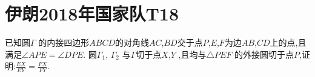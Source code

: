 \documentclass[question]{article}
\title{}
\author{}
\date{}
\begin{document}
\maketitle
\section{伊朗2018年国家队T18}{
已知圆$\Gamma$ 的内接四边形$ABCD$的对角线$AC$,$BD$交于点$P$,$E$,$F$为边$AB$,$CD$上的点,且满足$\angle APE = \angle DPE$. 圆$\Gamma_1$,  $\Gamma_2$ 与$\Gamma$切于点$X$,$Y$ ,且均与$\triangle PEF$ 的外接圆切于点$P$,证明:$\frac{EX}{EY}=\frac{FX}{FY}$.
}
\end{document}
